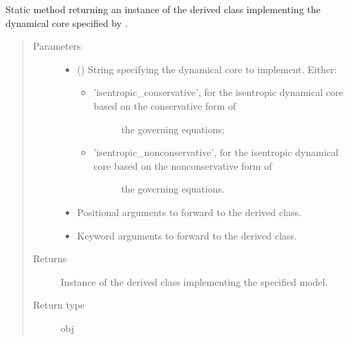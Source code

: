 \documentclass[letterpaper,10pt,english]{sphinxmanual}
\begin{document}
\begin{fulllineitems}
\begin{fulllineitems}
\label{\detokenize{api:dycore.dycore.DynamicalCore.factory}}
Static method returning an instance of the derived class implementing the dynamical core specified by .
\begin{quote}\begin{description}
\item[{Parameters}] \leavevmode\begin{itemize}
\item {} 
 () \textendash{} 
String specifying the dynamical core to implement. Either:
\begin{itemize}
\item {} \begin{description}
\item[{’isentropic\_conservative’, for the isentropic dynamical core based on the conservative form of}] \leavevmode
the governing equations;

\end{description}

\item {} \begin{description}
\item[{’isentropic\_nonconservative’, for the isentropic dynamical core based on the nonconservative form of}] \leavevmode
the governing equations.

\end{description}

\end{itemize}


\item {} 
 \textendash{} Positional arguments to forward to the derived class.

\item {} 
 \textendash{} Keyword arguments to forward to the derived class.

\end{itemize}

\item[{Returns}] \leavevmode
Instance of the derived class implementing the specified model.

\item[{Return type}] \leavevmode
obj

\end{description}\end{quote}


\end{fulllineitems}
\end{fulllineitems}
\end{document}
